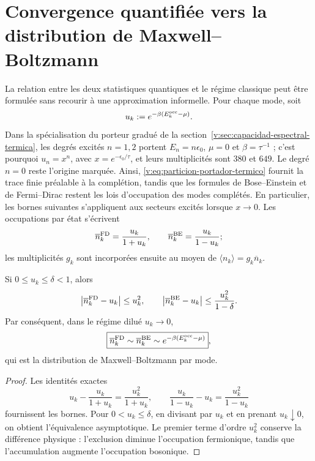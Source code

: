 \par\endgroup
\section[Convergence quantifiée vers la distribution de Maxwell--Boltzmann]{Convergence quantifiée vers la\\distribution de Maxwell--Boltzmann}
\label{v:rec:ocupacion:section:03}

La relation entre les deux statistiques quantiques et le régime classique peut
être formulée sans recourir à une approximation informelle. Pour chaque mode, soit
\[
 u_k:=e^{-\beta(E_k^{\rm occ}-\mu)}.
\]
Dans la spécialisation du porteur gradué de la
section~\ref{v:sec:capacidad-espectral-termica}, les degrés excités
$n=1,2$ portent $E_n=n\epsilon_0$, $\mu=0$ et
$\beta=\tau^{-1}$ ; c’est pourquoi $u_n=x^n$, avec
$x=e^{-\epsilon_0/\tau}$, et leurs multiplicités sont $380$ et $649$. Le
degré $n=0$ reste l’origine marquée. Ainsi,
\eqref{v:eq:particion-portador-termico} fournit la trace finie
préalable à la complétion, tandis que les formules de Bose--Einstein et de
Fermi--Dirac restent les lois d’occupation des modes
complétés. En particulier, les bornes suivantes s’appliquent aux
secteurs excités lorsque $x\to0$.
Les occupations par état s’écrivent
\[
 \overline n_k^{\rm FD}=\frac{u_k}{1+u_k},
 \qquad
 \overline n_k^{\rm BE}=\frac{u_k}{1-u_k};
\]
les multiplicités \(g_k\) sont incorporées ensuite au moyen de
\(\langle n_k\rangle=g_k\overline n_k\).

\begin{theorem}
\label{v:rec:thm:limite-clasico-fd-be-rev2}
Si \(0\leq u_k\leq\delta<1\), alors
\[
 \left|\overline n_k^{\rm FD}-u_k\right|\leq u_k^2,
 \qquad
 \left|\overline n_k^{\rm BE}-u_k\right|
 \leq\frac{u_k^2}{1-\delta}.
\]
Par conséquent, dans le régime dilué \(u_k\to0\),
\[
 \boxed{
 \overline n_k^{\rm FD}\sim
 \overline n_k^{\rm BE}\sim
 e^{-\beta(E_k^{\rm occ}-\mu)}} ,
\]
qui est la distribution de Maxwell--Boltzmann par mode.
\end{theorem}

\begin{proof}
Les identités exactes
\[
 u_k-\frac{u_k}{1+u_k}=\frac{u_k^2}{1+u_k},
 \qquad
 \frac{u_k}{1-u_k}-u_k=\frac{u_k^2}{1-u_k}
\]
fournissent les bornes. Pour \(0<u_k\leq\delta\), en divisant par \(u_k\) et
en prenant \(u_k\downarrow0\), on obtient
l’équivalence asymptotique. Le premier terme d’ordre \(u_k^2\) conserve la
différence physique : l’exclusion diminue l’occupation fermionique, tandis que
l’accumulation augmente l’occupation bosonique.
\end{proof}
